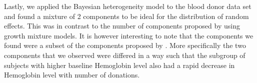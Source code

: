 Lastly, we applied the Bayesian heterogeneity model to the blood donor data set and found a mixture of 2 components to be ideal for the distribution of random effects. This was in contrast to the number of components proposed by \citet{nasserinejad_prevalence_2015} using growth mixture models. It is however interesting to note that the components we found were a subset of the components proposed by \citet{nasserinejad_prevalence_2015}. More specifically the two components that we observed were differed in a way such that the subgroup of subjects with higher baseline Hemoglobin level also had a rapid decrease in Hemoglobin level with number of donations.